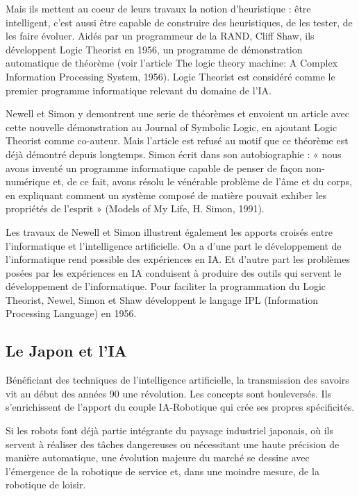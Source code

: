 Mais ils mettent au coeur de leurs travaux la notion d'heuristique : être intelligent, c'est aussi être capable de construire des heuristiques, de les tester, de les faire évoluer. Aidés par un programmeur de la RAND, Cliff Shaw, ils développent Logic Theorist en 1956, un programme de démonstration automatique de théorème (voir l'article The logic theory machine: A Complex Information Processing System, 1956). Logic Theorist est considéré comme le premier programme informatique relevant du
domaine de l'IA.

Newell et Simon y demontrent une serie de théorèmes et envoient un article avec cette nouvelle démonstration au Journal of Symbolic Logic, en ajoutant Logic Theorist comme co-auteur. Mais l'article est refusé au motif que ce théorème est déjà démontré depuis longtemps. Simon écrit dans son autobiographie : « nous avons inventé un programme informatique capable de penser de façon non-numérique et, de ce fait, avons résolu le vénérable problème de l'âme et du corps, en expliquant comment un système composé de matière pouvait exhiber les propriétés de l'esprit » (Models of My Life, H.
Simon, 1991).

Les travaux de Newell et Simon illustrent également les apports croisés entre l'informatique et l'intelligence artificielle. On a d'une part le développement de l'informatique rend possible des expériences en IA. Et d'autre part les problèmes posées par les expériences en IA conduisent à produire des outils qui servent le développement de l'informatique.
Pour faciliter la programmation du Logic Theorist, Newel, Simon et Shaw développent le
langage IPL (Information Processing Language) en 1956.










\subsection{Le Japon et l'IA}


Bénéficiant des techniques de l'intelligence artificielle, la transmission des savoirs vit au début des années 90 une révolution. Les concepts sont bouleversés. Ils s'enrichissent de l'apport du couple IA-Robotique qui crée ses propres spécificités.

Si les robots font déjà partie intégrante du paysage industriel japonais, où ils servent à réaliser des tâches dangereuses ou nécessitant une haute précision de manière automatique, une évolution majeure du marché se dessine avec l’émergence de la robotique de service et, dans une moindre mesure, de la robotique de loisir.

